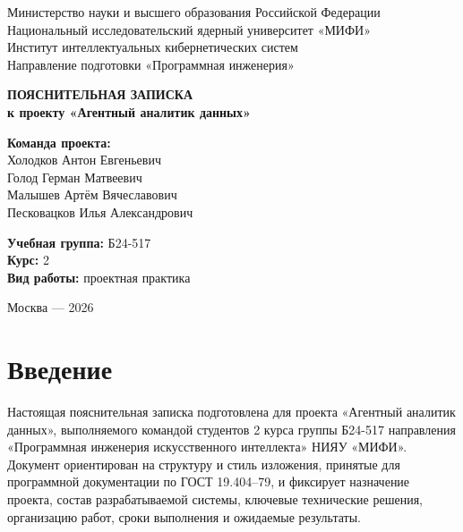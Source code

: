 \documentclass[14pt,a4paper]{extarticle}
\begin{document}
\begin{titlepage}
\begin{center}
Министерство науки и высшего образования Российской Федерации\\
Национальный исследовательский ядерный университет «МИФИ»\\
Институт интеллектуальных кибернетических систем\\
Направление подготовки «Программная инженерия»
\end{center}

\vspace{2cm}

\begin{center}
\textbf{\Large ПОЯСНИТЕЛЬНАЯ ЗАПИСКА}\\
\vspace{0.5cm}
\textbf{\large к проекту «Агентный аналитик данных»}
\end{center}

\vspace{2cm}

\noindent
\textbf{Команда проекта:}\\
Холодков Антон Евгеньевич\\
Голод Герман Матвеевич\\
Малышев Артём Вячеславович\\
Песковацков Илья Александрович

\vspace{1cm}

\noindent
\textbf{Учебная группа:} Б24-517\\
\textbf{Курс:} 2\\
\textbf{Вид работы:} проектная практика

\vfill

\begin{center}
Москва --- 2026
\end{center}
\end{titlepage}

\renewcommand{\contentsname}{Содержание}
\tableofcontents
\newpage

\section{Введение}

Настоящая пояснительная записка подготовлена для проекта «Агентный аналитик данных», выполняемого командой студентов 2 курса группы Б24-517 направления «Программная инженерия искусственного интеллекта» НИЯУ «МИФИ». Документ ориентирован на структуру и стиль изложения, принятые для программной документации по ГОСТ 19.404--79, и фиксирует назначение проекта, состав разрабатываемой системы, ключевые технические решения, организацию работ, сроки выполнения и ожидаемые результаты.
\end{document}
